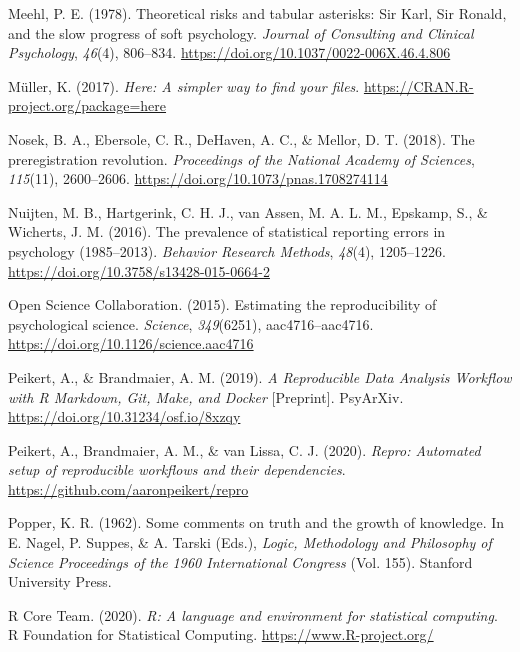 \documentclass[12pt,a4paper,]{article}
\begin{document}
\leavevmode\hypertarget{ref-meehlTheoreticalRisksTabular1978}{}%
Meehl, P. E. (1978). Theoretical risks and tabular asterisks: Sir Karl, Sir Ronald, and the slow progress of soft psychology. \emph{Journal of Consulting and Clinical Psychology}, \emph{46}(4), 806--834. \url{https://doi.org/10.1037/0022-006X.46.4.806}

\leavevmode\hypertarget{ref-R-here}{}%
Müller, K. (2017). \emph{Here: A simpler way to find your files}. \url{https://CRAN.R-project.org/package=here}

\leavevmode\hypertarget{ref-nosekPreregistrationRevolution2018}{}%
Nosek, B. A., Ebersole, C. R., DeHaven, A. C., \& Mellor, D. T. (2018). The preregistration revolution. \emph{Proceedings of the National Academy of Sciences}, \emph{115}(11), 2600--2606. \url{https://doi.org/10.1073/pnas.1708274114}

\leavevmode\hypertarget{ref-nuijtenPrevalenceStatisticalReporting2016}{}%
Nuijten, M. B., Hartgerink, C. H. J., van Assen, M. A. L. M., Epskamp, S., \& Wicherts, J. M. (2016). The prevalence of statistical reporting errors in psychology (1985--2013). \emph{Behavior Research Methods}, \emph{48}(4), 1205--1226. \url{https://doi.org/10.3758/s13428-015-0664-2}

\leavevmode\hypertarget{ref-opensciencecollaborationEstimatingReproducibilityPsychological2015}{}%
Open Science Collaboration. (2015). Estimating the reproducibility of psychological science. \emph{Science}, \emph{349}(6251), aac4716--aac4716. \url{https://doi.org/10.1126/science.aac4716}

\leavevmode\hypertarget{ref-peikertReproducibleDataAnalysis2019}{}%
Peikert, A., \& Brandmaier, A. M. (2019). \emph{A Reproducible Data Analysis Workflow with R Markdown, Git, Make, and Docker} {[}Preprint{]}. PsyArXiv. \url{https://doi.org/10.31234/osf.io/8xzqy}

\leavevmode\hypertarget{ref-R-repro}{}%
Peikert, A., Brandmaier, A. M., \& van Lissa, C. J. (2020). \emph{Repro: Automated setup of reproducible workflows and their dependencies}. \url{https://github.com/aaronpeikert/repro}

\leavevmode\hypertarget{ref-popperCommentsTruthGrowth1962}{}%
Popper, K. R. (1962). Some comments on truth and the growth of knowledge. In E. Nagel, P. Suppes, \& A. Tarski (Eds.), \emph{Logic, Methodology and Philosophy of Science Proceedings of the 1960 International Congress} (Vol. 155). Stanford University Press.

\leavevmode\hypertarget{ref-R-base}{}%
R Core Team. (2020). \emph{R: A language and environment for statistical computing}. R Foundation for Statistical Computing. \url{https://www.R-project.org/}
\end{document}
